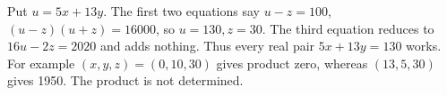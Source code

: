 Put $u=5x+13y$. The first two equations say $u-z=100$, $(u-z)(u+z)=16000$, so $u=130,z=30$. The third equation reduces to $16u-2z=2020$ and adds nothing. Thus every real pair $5x+13y=130$ works. For example $(x,y,z)=(0,10,30)$ gives product zero, whereas $(13,5,30)$ gives 1950. The product is not determined.
